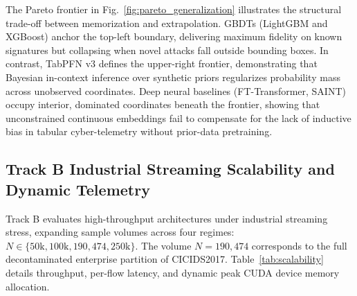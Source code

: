 \documentclass[10pt,a4paper]{article}
\begin{document}
The Pareto frontier in Fig.~\ref{fig:pareto_generalization} illustrates the structural trade-off between memorization and extrapolation. GBDTs (LightGBM and XGBoost) anchor the top-left boundary, delivering maximum fidelity on known signatures but collapsing when novel attacks fall outside bounding boxes. In contrast, TabPFN v3 defines the upper-right frontier, demonstrating that Bayesian in-context inference over synthetic priors regularizes probability mass across unobserved coordinates. Deep neural baselines (FT-Transformer, SAINT) occupy interior, dominated coordinates beneath the frontier, showing that unconstrained continuous embeddings fail to compensate for the lack of inductive bias in tabular cyber-telemetry without prior-data pretraining.

\subsection{Track B Industrial Streaming Scalability and Dynamic Telemetry}
Track B evaluates high-throughput architectures under industrial streaming stress, expanding sample volumes across four regimes: $N \in \{50\text{k}, 100\text{k}, 190,474, 250\text{k}\}$. The volume $N = 190,474$ corresponds to the full decontaminated enterprise partition of CICIDS2017. Table~\ref{tab:scalability} details throughput, per-flow latency, and dynamic peak CUDA device memory allocation.
\end{document}
